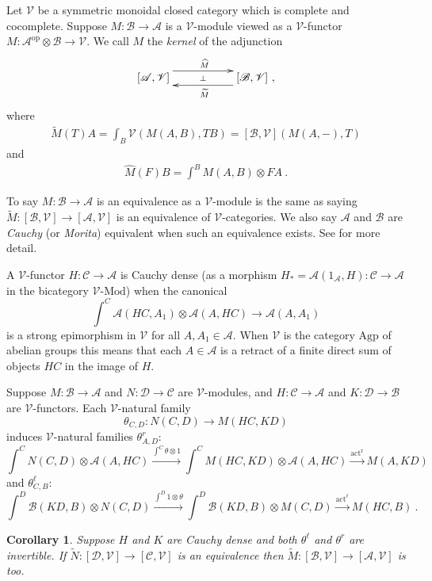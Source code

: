 \documentclass[a4paper,12pt,reqno]{amsart}
\newtheorem{corollary}[theorem]{Corollary}
\theoremstyle{definition}
\theoremstyle{fact}
\theoremstyle{genquest}
\theoremstyle{step}
\newcommand{\dd}{\colon}
\newcommand{\lra}{\longrightarrow}
\newcommand{\ra}{\rightarrow}
\def\CA{{\mathscr A}}
\def\CB{{\mathscr B}}
\def\CC{{\mathscr C}}
\def\CD{{\mathscr D}}
\def\CV{{\mathscr V}}
\begin{document}
Let $\CV$ be a symmetric monoidal closed category which is complete and cocomplete.
Suppose $M\dd \CB\ra \CA$ is a $\CV$-module viewed as a
$\CV$-functor $M\dd \CA^{\mathrm{op}} \otimes \CB \ra \CV$.
We call $M$ the {\em kernel} of the adjunction
\begin{equation}\label{keradj} 
\xymatrix @R-3mm {
[\CA,\CV] \ar@<1.5ex>[rr]^{\widehat{M}} \ar@{}[rr]|-{\bot} && [\CB,\CV]
 \ar@<1.5ex>[ll]^{\widetilde{M}} \ ,
}
\end{equation}
where 
\begin{eqnarray}\label{endtilde}
\widetilde{M}(T)A = \int_B{\CV(M(A,B),TB)} = [\CB,\CV](M(A,-),T)
\end{eqnarray}
and
\begin{eqnarray}\label{coendhat}
\widehat{M}(F)B = \int^B{M(A,B)\otimes FA \ .}
\end{eqnarray}

To say $M\dd \CB\ra \CA$ is an equivalence as a $\CV$-module
is the same as saying $\widetilde{M}\dd [\CB,\CV]\ra [\CA,\CV]$
is an equivalence of $\CV$-categories. We also say $\CA$
and $\CB$ are {\em Cauchy} (or {\em Morita}) equivalent when
such an equivalence exists. See \cite{ECC} for more detail.    

A $\CV$-functor $H\dd \CC \ra \CA$ is Cauchy dense 
(as a morphism $H_*=\CA(1_{\CA},H)\dd \CC \ra \CA$
in the bicategory $\CV\text{-}\mathrm{Mod}$) when the canonical
$$\int^C{\CA(HC,A_1)}\otimes \CA(A,HC)\ra \CA(A,A_1)$$ 
is a strong epimorphism in $\CV$ for all $A, A_1\in \CA$. 
When $\CV$ is the category $\mathrm{Agp}$ of abelian groups this means that each
$A\in \CA$ is a retract of a finite direct sum of objects $HC$ in the image of $H$. 

Suppose $M\dd \CB\ra \CA$ and $N\dd \CD\ra \CC$ are $\CV$-modules, and 
$H\dd \CC \ra \CA$ and $K\dd \CD\ra \CB$ are $\CV$-functors.
Each $\CV$-natural family 
$$\theta_{C,D}\dd N(C,D)\ra M(HC,KD)$$ 
induces $\CV$-natural families $\theta^{r}_{A,D}\dd$
$$\int^C{N(C,D)\otimes \CA(A,HC)} \stackrel{\int^C{\theta \otimes 1}}\lra \int^C{M(HC,KD)\otimes \CA(A,HC)} \stackrel{\mathrm{act^r}} \lra M(A,KD)$$ 
and $\theta^{\ell}_{C,B}\dd$
$$\int^D{\CB(KD,B)\otimes N(C,D)} \stackrel{\int^D{1 \otimes \theta}}\lra \int^D{\CB(KD,B)\otimes M(C,D)} \stackrel{\mathrm{act^{\ell}}} \lra M(HC,B) \ .$$

\begin{corollary}\label{gencor}
Suppose $H$ and $K$ are Cauchy dense and both $\theta^{\ell}$ and $\theta^{r}$
are invertible. If $\widetilde{N}\dd [\CD,\CV]\ra [\CC,\CV]$ is an equivalence then $\widetilde{M}\dd [\CB,\CV]\ra [\CA,\CV]$ is too. 
\end{corollary}
\end{document}
